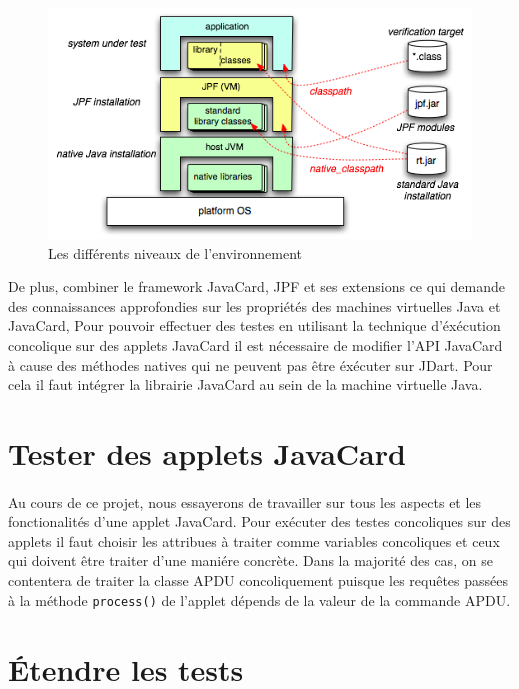 			\begin{figure}[H]
				\centering
					\includegraphics[scale=0.5]{images/layersJDart.png}
				\caption{\label{fig:jdart_layers} Les différents niveaux de l'environnement }
			\end{figure}
			
			De plus, combiner le framework JavaCard, \gls{JPF} et ses extensions ce qui demande des connaissances approfondies sur les propriétés des machines virtuelles
			Java et JavaCard, Pour pouvoir effectuer des testes en utilisant la technique d'éxécution concolique sur des applets JavaCard
			il est nécessaire de modifier l'API JavaCard à cause des méthodes natives qui ne peuvent pas être éxécuter sur JDart.
			Pour cela il faut intégrer la librairie JavaCard au sein de la machine virtuelle Java.
			
	\section{Tester des applets JavaCard}
		\paragraph{}
			Au cours de ce projet, nous essayerons de travailler sur tous les aspects et les fonctionalités d'une applet JavaCard.
			Pour exécuter des testes concoliques sur des applets il faut choisir les attribues à traiter comme variables concoliques et ceux
			qui doivent être traiter d'une maniére concrète.
			Dans la majorité des cas, on se contentera de traiter la classe APDU concoliquement puisque les requêtes passées à la méthode \verb|process()|
			de l'applet dépends de la valeur de la commande APDU.
	\section{Étendre les tests}
